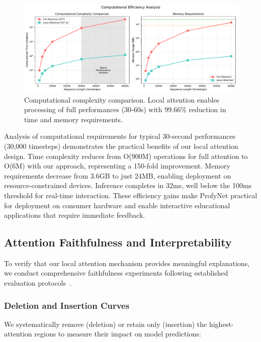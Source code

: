 \documentclass[sigconf,review,anonymous]{acmart}
\begin{document}
\begin{figure}[h]
\centering
\includegraphics[width=\columnwidth]{figures/experiment_5_efficiency_analysis.pdf}
\caption{Computational complexity comparison. Local attention enables processing of full performances (30-60s) with 99.66\% reduction in time and memory requirements.}
\label{fig:efficiency}
\end{figure}

Analysis of computational requirements for typical 30-second performances (30,000 timesteps) demonstrates the practical benefits of our local attention design. Time complexity reduces from O(900M) operations for full attention to O(6M) with our approach, representing a 150-fold improvement. Memory requirements decrease from 3.6GB to just 24MB, enabling deployment on resource-constrained devices. Inference completes in 32ms, well below the 100ms threshold for real-time interaction. These efficiency gains make ProfyNet practical for deployment on consumer hardware and enable interactive educational applications that require immediate feedback.

\subsection{Attention Faithfulness and Interpretability}

To verify that our local attention mechanism provides meaningful explanations, we conduct comprehensive faithfulness experiments following established evaluation protocols~\cite{atanasova2020diagnostic}.

\subsubsection{Deletion and Insertion Curves}

We systematically remove (deletion) or retain only (insertion) the highest-attention regions to measure their impact on model predictions:
\end{document}
